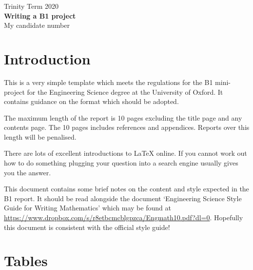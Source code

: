 \documentclass[11pt]{article}
\begin{document}
\begin{center}
\vspace*{2cm}
Trinity Term 2020\\ %
\vspace*{6cm}
 \huge{\textbf{Writing a B1 project}}\\ 
\vspace*{6cm}
{\large{My candidate number}} %
\thispagestyle{empty} %


\end{center}

\newpage

\setcounter{page}{1}

\section{Introduction}
This is a very simple template which meets the regulations for the B1 mini-project for the Engineering Science degree at the University of Oxford. It contains guidance on the format which should be adopted.

The maximum length of the report is 10 pages excluding the title page and any contents page. The 10 pages includes references and appendices. Reports over this length will be penalised.

There are lots of excellent introductions to \LaTeX{} online. If you cannot work out how to do something plugging your question into a search engine usually gives you the answer.

This document contains some brief notes on the content and style expected in the B1 report. It should be read alongside the document `Engineering Science Style Guide for Writing Mathematics' which may be found at \href{https://www.dropbox.com/s/r8etbcmcblgpzca/Engmath10.pdf?dl=0}{https://www.dropbox.com/s/r8etbcmcblgpzca/Engmath10.pdf?dl=0}. Hopefully this document is consistent with the official style guide!





\section{Tables}
\end{document}
